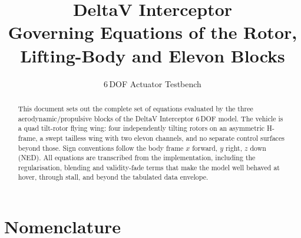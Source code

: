 \documentclass[11pt,a4paper]{article}
\title{\textbf{DeltaV Interceptor}\\[2mm]
\large Governing Equations of the Rotor, Lifting-Body and Elevon Blocks}
\author{6\,DOF Actuator Testbench}
\date{}
\begin{document}
\maketitle

\begin{abstract}
\noindent
This document sets out the complete set of equations evaluated by the three
aerodynamic/propulsive blocks of the DeltaV Interceptor 6\,DOF model. The
vehicle is a quad tilt-rotor flying wing: four independently tilting rotors on
an asymmetric H-frame, a swept tailless wing with two elevon channels, and no
separate control surfaces beyond those. Sign conventions follow the body frame
$x$ forward, $y$ right, $z$ down (NED). All equations are transcribed from the
implementation, including the regularisation, blending and validity-fade terms
that make the model well behaved at hover, through stall, and beyond the
tabulated data envelope.
\end{abstract}

\section*{Nomenclature}
\end{document}

